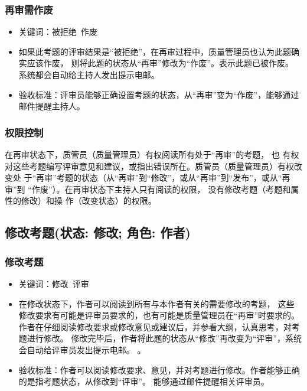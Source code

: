 \documentclass[hyperref, a4paper]{ctexart}
\providecommand{\tightlist}{%
  \setlength{\itemsep}{0pt}\setlength{\parskip}{0pt}}
\begin{document}
\hypertarget{ux518dux5ba1ux9700ux4f5cux5e9f}{%
\subsubsection{再审需作废}\label{ux518dux5ba1ux9700ux4f5cux5e9f}}

\begin{itemize}
\tightlist
\item
  关键词：被拒绝~作废
\item
  如果此考题的评审结果是``被拒绝''，在再审过程中，质量管理员也认为此题确实应该作废，
  则将此题的状态从``再审''修改为``作废''。表示此题已被作废。
  系统都会自动给主持人发出提示电邮。
\item
  验收标准：评审员能够正确设置考题的状态，从``再审''变为``作废''，能够通过邮件提醒主持人。
\end{itemize}

\hypertarget{ux6743ux9650ux63a7ux5236-1}{%
\subsubsection{权限控制}\label{ux6743ux9650ux63a7ux5236-1}}

在再审状态下，质管员（质量管理员）有权阅读所有处于``再审''的考题， 也
有权对这些考题编写评审意见和建议，或指出错误所在。质管员（质量管理员）有权改变处
于``再审''考题的状态（从``再审''到``修改''，或从``再审''到``发布''，或从``再审''到
``作废''）。在再审状态下主持人只有阅读的权限，
没有修改考题（考题和属性的修改）和操 作（改变状态）的权限。

\hypertarget{ux4feeux6539ux8003ux9898ux72b6ux6001-ux4feeux6539-ux89d2ux8272-ux4f5cux8005}{%
\subsection{修改考题(状态: 修改; 角色:
作者)}\label{ux4feeux6539ux8003ux9898ux72b6ux6001-ux4feeux6539-ux89d2ux8272-ux4f5cux8005}}

\hypertarget{ux4feeux6539ux8003ux9898}{%
\subsubsection{修改考题}\label{ux4feeux6539ux8003ux9898}}

\begin{itemize}
\tightlist
\item
  关键词：修改~评审
\item
  在修改状态下，作者可以阅读到所有与本作者有关的需要修改的考题，
  这些修改要求有可能是评审员要求的，也有可能是质量管理员在``再审''时要求的。
  作者在仔细阅读修改要求或修改意见或建议后，并参看大纲，认真思考，对考题进行修改。
  修改完毕后，作者将此题的状态从``修改''再改变为``评审''，系统会自动给评审员发出提示电邮。
  。
\item
  验收标准：作者可以阅读修改要求、意见，并对考题进行修改。作者能够正确的是指考题状态，从修改到``评审''。
  能够通过邮件提醒相关评审员。
\end{itemize}
\end{document}
